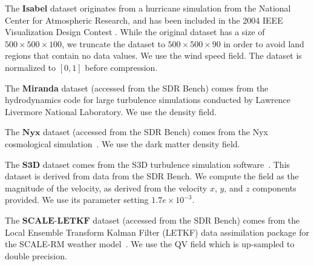 The \textbf{Isabel} dataset originates from a hurricane simulation from the National Center for Atmospheric Research, and has been included in the 2004 IEEE Visualization Design Contest \cite{scivis2004}.
While the original dataset has a size of  $500 \times 500 \times 100$, we truncate the dataset to $500 \times 500 \times 90$ in order to avoid land regions that contain no data values. We use the wind speed field. The dataset is normalized to $[0,1]$ before compression.

The \textbf{Miranda} dataset (accessed from the SDR Bench) comes from the hydrodynamics code for large turbulence simulations conducted by Lawrence Livermore National Laboratory. We use the density field.

The $\textbf{Nyx}$ dataset (accessed from the SDR Bench) comes from the Nyx cosmological simulation~\cite{almgren2013nyx}. We use the dark matter density field.

The $\textbf{S3D}$ dataset comes from the S3D turbulence simulation software~\cite{treichler2017s3d}. This dataset is derived from data from the SDR Bench. We compute the field as the magnitude of the velocity, as derived from the velocity $x$, $y$, and $z$ components provided. We use its parameter setting $1.7e \times 10^{-3}$.

The $\textbf{SCALE-LETKF}$ dataset (accessed from the SDR Bench) comes from the Local Ensemble Transform Kalman Filter (LETKF) data assimilation package for the SCALE-RM weather model~\cite{lien2017near}. We use the QV field which is up-sampled to double precision.